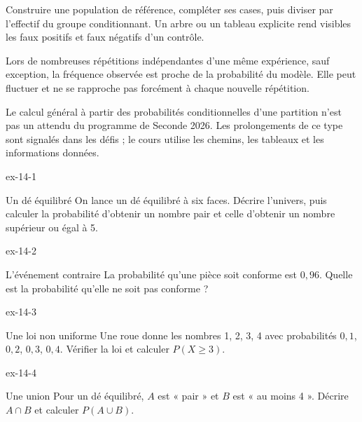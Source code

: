 \begin{savoirfaire}Construire une population de référence, compléter ses cases, puis diviser par l’effectif du groupe conditionnant. Un arbre ou un tableau explicite rend visibles les faux positifs et faux négatifs d’un contrôle.\end{savoirfaire}
\begin{propriete}Lors de nombreuses répétitions indépendantes d’une même expérience, sauf exception, la fréquence observée est proche de la probabilité du modèle. Elle peut fluctuer et ne se rapproche pas forcément à chaque nouvelle répétition.\end{propriete}
\begin{attention}Le calcul général à partir des probabilités conditionnelles d’une partition n’est pas un attendu du programme de Seconde 2026. Les prolongements de ce type sont signalés dans les défis ; le cours utilise les chemins, les tableaux et les informations données.\end{attention}
\clearpage{}
\begin{blocLivre}{ex-14-1}
\begin{exercice}[1]{Un dé équilibré}
On lance un dé équilibré à six faces. Décrire l’univers, puis calculer la probabilité d’obtenir un nombre pair et celle d’obtenir un nombre supérieur ou égal à 5.
\end{exercice}
\end{blocLivre}
\begin{blocLivre}{ex-14-2}
\begin{exercice}[1]{L’événement contraire}
La probabilité qu’une pièce soit conforme est $0{,}96$. Quelle est la probabilité qu’elle ne soit pas conforme ?
\end{exercice}
\end{blocLivre}
\begin{blocLivre}{ex-14-3}
\begin{exercice}[1]{Une loi non uniforme}
Une roue donne les nombres 1, 2, 3, 4 avec probabilités $0{,}1$, $0{,}2$, $0{,}3$, $0{,}4$. Vérifier la loi et calculer $P(X\ge3)$.
\end{exercice}
\end{blocLivre}
\begin{blocLivre}{ex-14-4}
\begin{exercice}[1]{Une union}
Pour un dé équilibré, $A$ est « pair » et $B$ est « au moins 4 ». Décrire $A\cap B$ et calculer $P(A\cup B)$.
\end{exercice}
\end{blocLivre}
